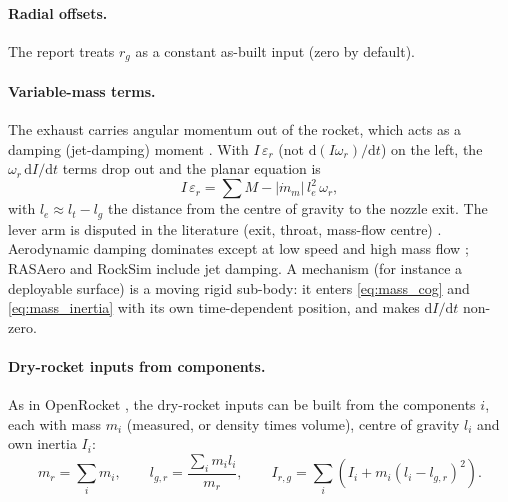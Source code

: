 \paragraph{Radial offsets.} The report treats $r_g$ as a constant as-built input (zero by default).

\paragraph{Variable-mass terms.} The exhaust carries angular momentum out of the rocket, which acts
as a damping (jet-damping) moment \cite{vanderha}. With $I\,\varepsilon_r$ (not
$\mathrm{d}(I\omega_r)/\mathrm{d}t$) on the left, the $\omega_r\,\mathrm{d}I/\mathrm{d}t$ terms drop
out and the planar equation is
\begin{equation} \label{eq:jet_damping}
    I\,\varepsilon_r = \sum M - |\dot m_m|\,l_e^2\,\omega_r,
\end{equation}
with $l_e\approx l_t-l_g$ the distance from the centre of gravity to the nozzle exit. The lever arm
is disputed in the literature (exit, throat, mass-flow centre) \cite{vanderha}. Aerodynamic damping
dominates except at low speed and high mass flow \cite{kowal,dtic}; RASAero and RockSim include jet
damping.
A mechanism (for instance a deployable surface) is a moving rigid sub-body: it enters
\autoref{eq:mass_cog} and \autoref{eq:mass_inertia} with its own time-dependent position, and makes
$\mathrm{d}I/\mathrm{d}t$ non-zero.

\paragraph{Dry-rocket inputs from components.} As in OpenRocket \cite{orguide}, the dry-rocket
inputs can be built from the components $i$, each with mass $m_i$ (measured, or density times
volume), centre of gravity $l_i$ and own inertia $I_i$:
\begin{equation}
    m_r=\sum_i m_i, \qquad l_{g,r}=\frac{\sum_i m_il_i}{m_r}, \qquad
    I_{r,g}=\sum_i\left(I_i+m_i(l_i-l_{g,r})^2\right).
\end{equation}

